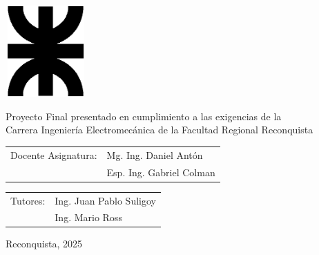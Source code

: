 \thispagestyle{empty}

\begin{center}
	\vspace*{2cm}
	\includegraphics[width=31mm,height=35mm]{imagenes/LogoUTN_nvgsb.eps}
\end{center}	
	\vspace{3cm}
	

		\begin{adjustwidth}{3cm}{0cm}
			\hspace*{1.27cm}Proyecto Final presentado en cumplimiento a las exigencias de la\\ Carrera Ingeniería Electromecánica de la Facultad Regional Reconquista\\
		\end{adjustwidth}

	
	

\vspace{7.5cm}

	\begin{tabular}{@{}p{}p{}@{}}
		Docente Asignatura: & Mg. Ing. Daniel Antón\\
							& Esp. Ing. Gabriel Colman
	\end{tabular}
	
	\begin{tabular}{@{}p{}p{}@{}}
			Tutores: & Ing. Juan Pablo Suligoy \\
					  & Ing. Mario Ross
	\end{tabular}


\vfill

\begin{center}\begin{large}
		Reconquista, 2025
\end{large}\end{center}
